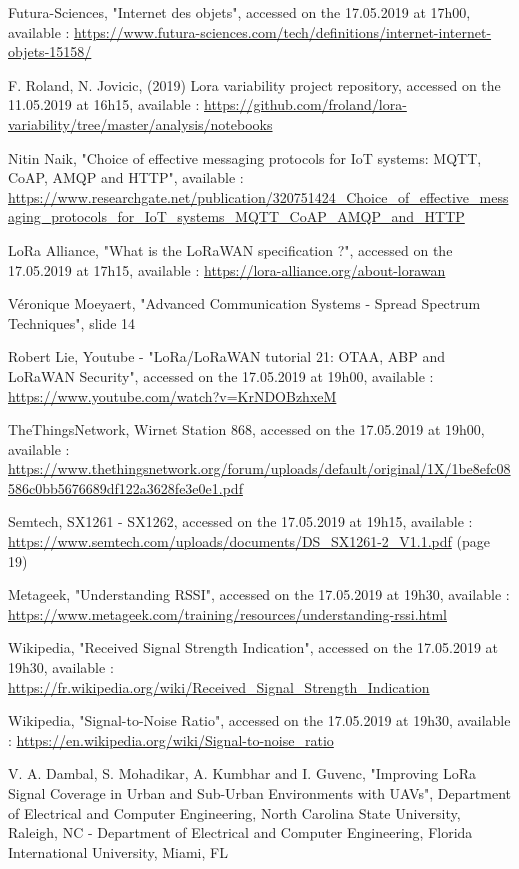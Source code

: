 \documentclass[letterpaper, 10 pt, conference]{ieeeconf}  %
\begin{document}
\begin{thebibliography}{99}

 Futura-Sciences, "Internet des objets", accessed on the 17.05.2019 at 17h00, available : \url{https://www.futura-sciences.com/tech/definitions/internet-internet-objets-15158/}

 F. Roland, N. Jovicic, (2019) Lora variability project repository, accessed on the 11.05.2019 at 16h15, available : \url{https://github.com/froland/lora-variability/tree/master/analysis/notebooks}

 Nitin Naik, "Choice of effective messaging protocols for IoT systems: MQTT, CoAP, AMQP and HTTP", available : \url{https://www.researchgate.net/publication/320751424_Choice_of_effective_messaging_protocols_for_IoT_systems_MQTT_CoAP_AMQP_and_HTTP}

 LoRa Alliance, "What is the LoRaWAN specification ?", accessed on the 17.05.2019 at 17h15, available :  \url{https://lora-alliance.org/about-lorawan}

 V\'eronique Moeyaert, "Advanced Communication Systems - Spread Spectrum Techniques", slide 14

 Robert Lie, Youtube - "LoRa/LoRaWAN tutorial 21: OTAA, ABP and LoRaWAN Security", accessed on the 17.05.2019 at 19h00, available : \url{https://www.youtube.com/watch?v=KrNDOBzhxeM}

 TheThingsNetwork, Wirnet Station 868, accessed on the 17.05.2019 at 19h00, available : \url{https://www.thethingsnetwork.org/forum/uploads/default/original/1X/1be8efc08586c0bb5676689df122a3628fe3e0e1.pdf}

 Semtech, SX1261 - SX1262, accessed on the 17.05.2019 at 19h15, available : \url{https://www.semtech.com/uploads/documents/DS_SX1261-2_V1.1.pdf} (page 19)

 Metageek, "Understanding RSSI", accessed on the 17.05.2019 at 19h30, available : \url{https://www.metageek.com/training/resources/understanding-rssi.html}

 Wikipedia, "Received Signal Strength Indication", accessed on the 17.05.2019 at 19h30, available : \url{https://fr.wikipedia.org/wiki/Received_Signal_Strength_Indication}

 Wikipedia, "Signal-to-Noise Ratio", accessed on the 17.05.2019 at 19h30, available : \url{https://en.wikipedia.org/wiki/Signal-to-noise_ratio}

 V. A. Dambal, S. Mohadikar, A. Kumbhar and I. Guvenc, "Improving LoRa Signal Coverage in Urban and
Sub-Urban Environments with UAVs", Department of Electrical and Computer Engineering, North Carolina State University, Raleigh, NC -
Department of Electrical and Computer Engineering, Florida International University, Miami, FL


\end{thebibliography}
\end{document}
